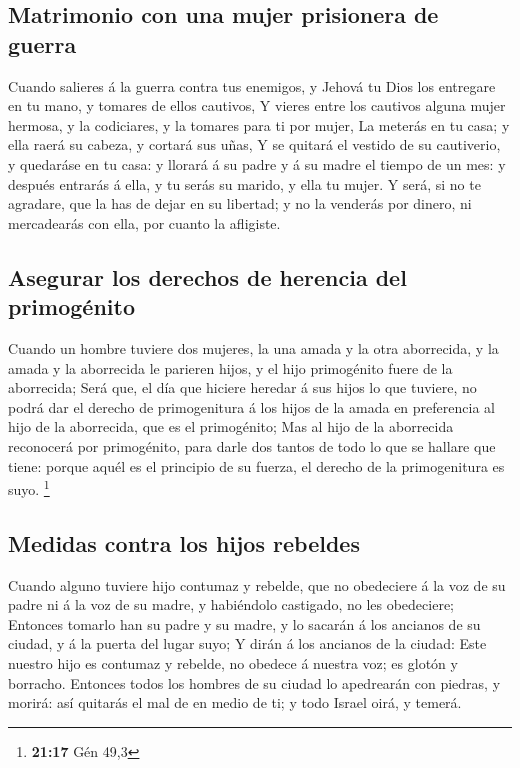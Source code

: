 \hypertarget{matrimonio-con-una-mujer-prisionera-de-guerra}{%
\subsection{Matrimonio con una mujer prisionera de
guerra}\label{matrimonio-con-una-mujer-prisionera-de-guerra}}

 Cuando salieres á la guerra contra tus enemigos, y Jehová
tu Dios los entregare en tu mano, y tomares de ellos cautivos,
 Y vieres entre los cautivos alguna mujer hermosa, y la
codiciares, y la tomares para ti por mujer,  La meterás en
tu casa; y ella raerá su cabeza, y cortará sus uñas,  Y se
quitará el vestido de su cautiverio, y quedaráse en tu casa: y llorará á
su padre y á su madre el tiempo de un mes: y después entrarás á ella, y
tu serás su marido, y ella tu mujer.  Y será, si no te
agradare, que la has de dejar en su libertad; y no la venderás por
dinero, ni mercadearás con ella, por cuanto la afligiste.

\hypertarget{asegurar-los-derechos-de-herencia-del-primoguxe9nito}{%
\subsection{Asegurar los derechos de herencia del
primogénito}\label{asegurar-los-derechos-de-herencia-del-primoguxe9nito}}

 Cuando un hombre tuviere dos mujeres, la una amada y la
otra aborrecida, y la amada y la aborrecida le parieren hijos, y el hijo
primogénito fuere de la aborrecida;  Será que, el día que
hiciere heredar á sus hijos lo que tuviere, no podrá dar el derecho de
primogenitura á los hijos de la amada en preferencia al hijo de la
aborrecida, que es el primogénito;  Mas al hijo de la
aborrecida reconocerá por primogénito, para darle dos tantos de todo lo
que se hallare que tiene: porque aquél es el principio de su fuerza, el
derecho de la primogenitura es suyo. \footnote{\textbf{21:17} Gén 49,3}

\hypertarget{medidas-contra-los-hijos-rebeldes}{%
\subsection{Medidas contra los hijos
rebeldes}\label{medidas-contra-los-hijos-rebeldes}}

 Cuando alguno tuviere hijo contumaz y rebelde, que no
obedeciere á la voz de su padre ni á la voz de su madre, y habiéndolo
castigado, no les obedeciere;  Entonces tomarlo han su
padre y su madre, y lo sacarán á los ancianos de su ciudad, y á la
puerta del lugar suyo;  Y dirán á los ancianos de la
ciudad: Este nuestro hijo es contumaz y rebelde, no obedece á nuestra
voz; es glotón y borracho.  Entonces todos los hombres de
su ciudad lo apedrearán con piedras, y morirá: así quitarás el mal de en
medio de ti; y todo Israel oirá, y temerá.


